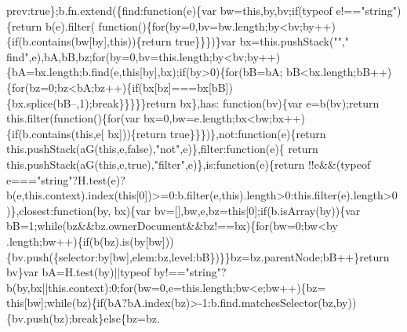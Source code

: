 \begin{DoxyCode}
      prev:\textcolor{keyword}{true}\};b.fn.extend(\{find:\textcolor{keyword}{function}(e)\{var bw=\textcolor{keyword}{this},by,bv;\textcolor{keywordflow}{if}(typeof e!==\textcolor{stringliteral}{"string"})\{\textcolor{keywordflow}{return} b(e).filter(\textcolor{keyword}{
      function}()\{\textcolor{keywordflow}{for}(by=0,bv=bw.length;by<bv;by++)\{if(b.contains(bw[by],this))\{return true\}\}\})\}var bx=this.pushStack(\textcolor{stringliteral}{""},\textcolor{stringliteral}{"
      find"},e),bA,bB,bz;\textcolor{keywordflow}{for}(by=0,bv=this.length;by<bv;by++)\{bA=bx.length;b.find(e,\textcolor{keyword}{this}[by],bx);\textcolor{keywordflow}{if}(by>0)\{\textcolor{keywordflow}{for}(bB=bA;
      bB<bx.length;bB++)\{\textcolor{keywordflow}{for}(bz=0;bz<bA;bz++)\{\textcolor{keywordflow}{if}(bx[bz]===bx[bB])\{bx.splice(bB--,1);\textcolor{keywordflow}{break}\}\}\}\}\}\textcolor{keywordflow}{return} bx\},has:\textcolor{keyword}{
      function}(bv)\{var e=b(bv);\textcolor{keywordflow}{return} this.filter(\textcolor{keyword}{function}()\{\textcolor{keywordflow}{for}(var bx=0,bw=e.length;bx<bw;bx++)\{if(b.contains(this,e[
      bx]))\{return true\}\}\})\},not:\textcolor{keyword}{function}(e)\{\textcolor{keywordflow}{return} this.pushStack(aG(\textcolor{keyword}{this},e,\textcolor{keyword}{false}),\textcolor{stringliteral}{"not"},e)\},filter:\textcolor{keyword}{function}(e)\{\textcolor{keywordflow}{
      return} this.pushStack(aG(\textcolor{keyword}{this},e,\textcolor{keyword}{true}),\textcolor{stringliteral}{"filter"},e)\},is:\textcolor{keyword}{function}(e)\{\textcolor{keywordflow}{return} !!e&&(typeof e===\textcolor{stringliteral}{"string"}?H.test(e)?
      b(e,this.context).index(\textcolor{keyword}{this}[0])>=0:b.filter(e,\textcolor{keyword}{this}).length>0:this.filter(e).length>0)\},closest:\textcolor{keyword}{function}(by,
      bx)\{var bv=[],bw,e,bz=\textcolor{keyword}{this}[0];\textcolor{keywordflow}{if}(b.isArray(by))\{var bB=1;\textcolor{keywordflow}{while}(bz&&bz.ownerDocument&&bz!==bx)\{\textcolor{keywordflow}{for}(bw=0;bw<by
      .length;bw++)\{\textcolor{keywordflow}{if}(b(bz).is(by[bw]))\{bv.push(\{selector:by[bw],elem:bz,level:bB\})\}\}bz=bz.parentNode;bB++\}\textcolor{keywordflow}{return}
       bv\}var bA=H.test(by)||typeof by!==\textcolor{stringliteral}{"string"}?b(by,bx||this.context):0;\textcolor{keywordflow}{for}(bw=0,e=this.length;bw<e;bw++)\{bz=\textcolor{keyword}{
      this}[bw];\textcolor{keywordflow}{while}(bz)\{\textcolor{keywordflow}{if}(bA?bA.index(bz)>-1:b.find.matchesSelector(bz,by))\{bv.push(bz);\textcolor{keywordflow}{break}\}\textcolor{keywordflow}{else}\{bz=bz.

\end{DoxyCode}
